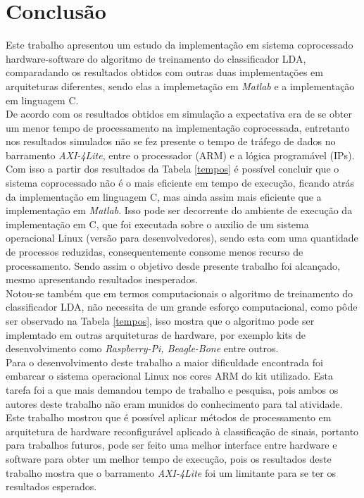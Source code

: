 \chapter[Conclusao]{Conclusão}

Este trabalho apresentou um estudo da implementação em sistema coprocessado hardware-software do algoritmo de treinamento do classificador LDA, comparadando os resultados obtidos com outras duas implementações em arquiteturas diferentes, sendo elas a implemetação em \textit{Matlab} \cite{F.Lotte} e a implementação em linguagem C.\\

De acordo com os resultados obtidos em simulação a expectativa era de se obter um menor tempo de processamento na implementação coprocessada, entretanto nos resultados simulados não se fez presente o tempo de tráfego de dados no barramento \textit{AXI-4Lite}, entre o processador (ARM) e a lógica programável (IPs). Com isso a partir dos resultados da Tabela \ref{tempos} é possível concluir que o sistema coprocessado não é o mais eficiente em tempo de execução, ficando atrás da implementação em linguagem C, mas ainda assim mais eficiente que a implementação em \textit{Matlab}. Isso pode ser decorrente do ambiente de execução da implementação em C, que foi executada sobre o auxilio de um sistema operacional Linux (versão para desenvolvedores), sendo esta com uma quantidade de processos reduzidas, consequentemente consome menos recurso de processamento. Sendo assim o objetivo desde presente trabalho foi
alcançado, mesmo apresentando resultados inesperados.\\

Notou-se também que em termos computacionais o algoritmo de treinamento do classificador LDA, não necessita de um grande esforço computacional, como pôde ser observado na Tabela \ref{tempos}, isso mostra que o algoritmo pode ser implemtado em outras arquiteturas de hardware, por exemplo kits de desenvolvimento como \textit{Raspberry-Pi, Beagle-Bone} entre outros.\\

Para o desenvolvimento deste trabalho a maior dificuldade encontrada foi embarcar o sistema operacional Linux nos cores ARM do kit utilizado. Esta tarefa foi a que mais demandou tempo de trabalho e pesquisa, pois ambos os autores deste trabalho não eram munidos do conhecimento para tal atividade. \\

Este trabalho mostrou que é possível aplicar métodos de processamento em arquitetura de hardware reconfigurável aplicado à classificação de sinais, portanto para trabalhos futuros, pode ser feito uma melhor interface entre hardware e software para obter um melhor tempo de execução, pois os resultados deste trabalho mostra que o barramento \textit{AXI-4Lite} foi um limitante para se ter os resultados esperados. 